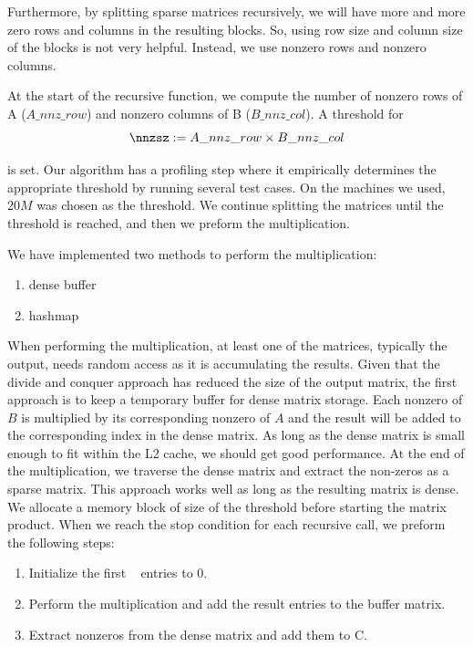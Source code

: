 Furthermore, by splitting sparse matrices recursively, we will have more and more zero rows and columns in the resulting blocks. So, using row size and column size of the blocks is not very helpful. Instead, we use nonzero rows and nonzero columns.

At the start of the recursive function, we compute the number of nonzero rows of A ($A\_nnz\_row$) and nonzero columns of B ($B\_nnz\_col$). A threshold for 
\begin{equation}
    \nnzsz := A\_nnz\_row \times B\_nnz\_col\label{eq:thres2}
\end{equation}

is set. Our algorithm has a profiling step where it empirically determines the appropriate threshold by running several test cases. On the machines we used,  $20M$ was chosen as the threshold. We continue splitting the matrices until the threshold is reached, and then we preform the multiplication.


We have implemented two methods to perform the multiplication: 
\begin{enumerate}
    \item dense buffer
    \item hashmap
\end{enumerate}

When performing the multiplication, at least one of the matrices, typically the output, needs random access as it is accumulating the results. Given that the divide and conquer approach has reduced the size of the output matrix, the first approach is to keep a temporary buffer for dense matrix storage. Each nonzero of $B$ is multiplied by its corresponding nonzero of $A$ and the result will be added to the corresponding index in the dense matrix. As long as the dense matrix is small enough to fit within the L2 cache, we should get good performance. At the end of the multiplication, we traverse the dense matrix and extract the non-zeros as a sparse matrix. This approach works well as long as the resulting matrix is dense. We allocate a memory block of size of the threshold before starting the matrix product. When we reach the stop condition for each recursive call, we preform the following steps:
\begin{enumerate}
    \item Initialize the first \nnzsz~ entries to 0.
    \item Perform the multiplication and add the result entries to the buffer matrix.
    \item Extract nonzeros from the dense matrix and add them to C.
\end{enumerate}

